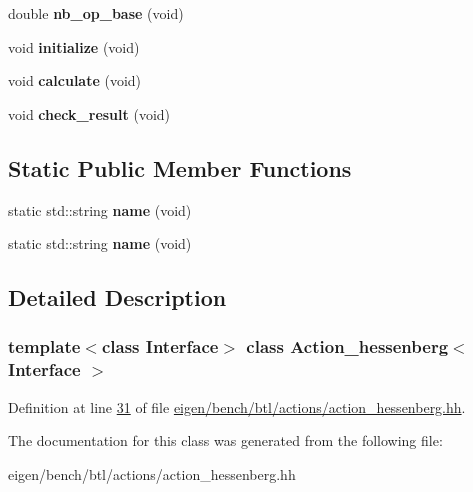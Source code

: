 \begin{DoxyCompactItemize}
\item 
\mbox{\label{class_action__hessenberg_aa30eedde77c67377fc6e8dda91a48056}} 
double {\bfseries nb\+\_\+op\+\_\+base} (void)
\item 
\mbox{\label{class_action__hessenberg_ac969cacb8011f95a41e77b9cae4f04fa}} 
void {\bfseries initialize} (void)
\item 
\mbox{\label{class_action__hessenberg_a23a90fa377d8db18f94555a1979255d3}} 
void {\bfseries calculate} (void)
\item 
\mbox{\label{class_action__hessenberg_ae9339fa00f6afc34f24374d31254ec0f}} 
void {\bfseries check\+\_\+result} (void)
\end{DoxyCompactItemize}
\subsection*{Static Public Member Functions}
\begin{DoxyCompactItemize}
\item 
\mbox{\label{class_action__hessenberg_ab542545ee7e49fd658bf0d1ab26da7be}} 
static std\+::string {\bfseries name} (void)
\item 
\mbox{\label{class_action__hessenberg_ab542545ee7e49fd658bf0d1ab26da7be}} 
static std\+::string {\bfseries name} (void)
\end{DoxyCompactItemize}


\subsection{Detailed Description}
\subsubsection*{template$<$class Interface$>$\newline
class Action\+\_\+hessenberg$<$ Interface $>$}



Definition at line \hyperlink{eigen_2bench_2btl_2actions_2action__hessenberg_8hh_source_l00031}{31} of file \hyperlink{eigen_2bench_2btl_2actions_2action__hessenberg_8hh_source}{eigen/bench/btl/actions/action\+\_\+hessenberg.\+hh}.



The documentation for this class was generated from the following file\+:\begin{DoxyCompactItemize}
\item 
eigen/bench/btl/actions/action\+\_\+hessenberg.\+hh\end{DoxyCompactItemize}
